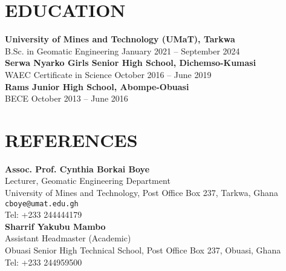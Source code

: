 \documentclass[a4paper,10pt]{article}
\begin{document}
\section*{EDUCATION}
\textbf{University of Mines and Technology (UMaT), Tarkwa} \\
B.Sc. in Geomatic Engineering \hfill January 2021 – September 2024 \\

\textbf{Serwa Nyarko Girls Senior High School, Dichemso-Kumasi} \\
WAEC Certificate in Science \hfill October 2016 – June 2019 \\

\textbf{Rams Junior High School, Abompe-Obuasi} \\
BECE \hfill October 2013 – June 2016

\section*{REFERENCES}
\textbf{Assoc. Prof. Cynthia Borkai Boye} \\
Lecturer, Geomatic Engineering Department \\
University of Mines and Technology, Post Office Box 237, Tarkwa, Ghana \\
\texttt{cboye@umat.edu.gh} \\
 Tel: +233 244444179 \\[0.2cm]
 
 \noindent\textbf{Sharrif Yakubu Mambo} \\ 
Assistant Headmaster (Academic) \\
Obuasi Senior High Technical School, Post Office Box 237, Obuasi, Ghana \\
Tel: +233 244959500
\end{document}
